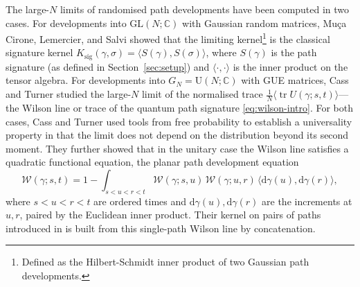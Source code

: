 \documentclass[11pt,a4paper]{article}
\DeclareMathOperator{\tr}{tr}
\newcommand{\cW}{\mathcal{W}}
\newcommand{\dd}{\mathrm{d}}
\begin{document}
The large-$N$ limits of randomised path developments have been computed in two cases. For developments into $\mathrm{GL}(N;\mathbb{C})$ with Gaussian random matrices, Muça Cirone, Lemercier, and Salvi \cite{cirone2023neural} showed that the limiting kernel\footnote{Defined as the Hilbert-Schmidt inner product of two Gaussian path developments.} is the classical signature kernel \cite{kiraly2019kernels} $K_{\mathrm{sig}}(\gamma,\sigma) = \langle S(\gamma),S(\sigma)\rangle$, where $S(\gamma)$ is the path signature (as defined in Section~\ref{sec:setup}) and $\langle\cdot,\cdot\rangle$ is the inner product on the tensor algebra. For developments into $G_N = \mathrm{U}(N;\mathbb{C})$ with GUE matrices, Cass and Turner \cite{cass2026free} studied the large-$N$ limit of the normalised trace $\frac{1}{N}\langle\tr U(\gamma;s,t)\rangle$---the Wilson line or trace of the quantum path signature \eqref{eq:wilson-intro}. For both cases, Cass and Turner used tools from free probability \cite{voiculescu1986addition,nica2006lectures,anderson2010introduction} to establish a universality property in that the limit does not depend on the distribution beyond its second moment. They further showed that in the unitary case the Wilson line satisfies a quadratic functional equation, the planar path development equation
\begin{equation}\label{eq:CT-intro}
  \cW(\gamma;s,t) = 1 - \int_{s<u<r<t}
  \cW(\gamma;s,u)\,\cW(\gamma;u,r)\,
  \langle\dd\gamma(u),\dd\gamma(r)\rangle ,
\end{equation}
where $s<u<r<t$ are ordered times and $\dd\gamma(u),\dd\gamma(r)$ are the increments at $u,r$, paired by the Euclidean inner product. Their kernel on pairs of paths introduced in \cite{cass2026free} is built from this single-path Wilson line by concatenation. 
\end{document}
